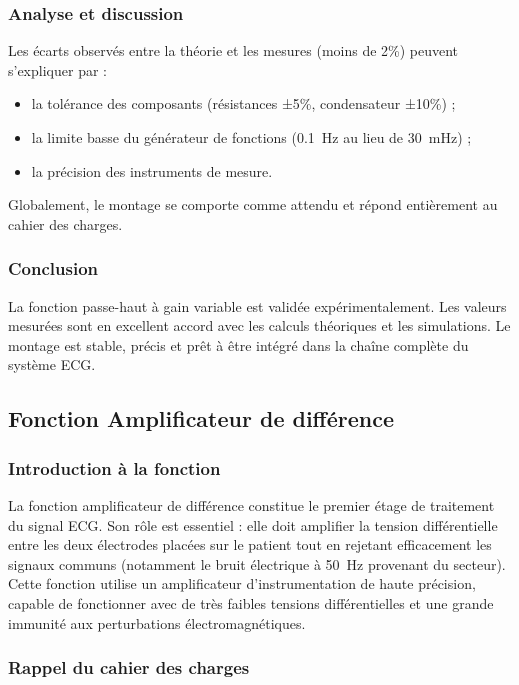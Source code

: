 \documentclass{article}
\begin{document}
\subsubsection{Analyse et discussion}

Les écarts observés entre la théorie et les mesures (moins de 2\%) peuvent s’expliquer par :
\begin{itemize}
    \item la tolérance des composants (résistances ±5\%, condensateur ±10\%) ;
    \item la limite basse du générateur de fonctions (0.1~Hz au lieu de 30~mHz) ;
    \item la précision des instruments de mesure.
\end{itemize}

Globalement, le montage se comporte comme attendu et répond entièrement au cahier des charges.


\subsubsection{Conclusion}

La fonction passe-haut à gain variable est validée expérimentalement.  
Les valeurs mesurées sont en excellent accord avec les calculs théoriques et les simulations.  
Le montage est stable, précis et prêt à être intégré dans la chaîne complète du système ECG.

\subsection{Fonction Amplificateur de différence}

\subsubsection{Introduction à la fonction}

La fonction amplificateur de différence constitue le premier étage de traitement du signal ECG. Son rôle est essentiel : elle doit amplifier la tension différentielle entre les deux électrodes placées sur le patient tout en rejetant efficacement les signaux communs (notamment le bruit électrique à 50~Hz provenant du secteur). Cette fonction utilise un amplificateur d'instrumentation de haute précision, capable de fonctionner avec de très faibles tensions différentielles et une grande immunité aux perturbations électromagnétiques.

\subsubsection{Rappel du cahier des charges}
\end{document}
